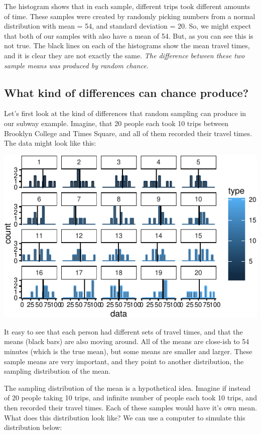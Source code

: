 The histogram shows that in each sample, different trips took different
amounts of time. These samples were created by randomly picking numbers
from a normal distribution with mean = 54, and standard deviation = 20.
So, we might expect that both of our samples with also have a mean of
54. But, as you can see this is not true. The black lines on each of the
histograms show the mean travel times, and it is clear they are not
exactly the same.
\emph{The difference between these two sample means was produced by random chance.}

\subsection{What kind of differences can chance
produce?}\label{what-kind-of-differences-can-chance-produce}

Let's first look at the kind of differences that random sampling can
produce in our subway example. Imagine, that 20 people each took 10
trips between Brooklyn College and Times Square, and all of them
recorded their travel times. The data might look like this:

\includegraphics{Ttest_files/figure-latex/unnamed-chunk-3-1}

It easy to see that each person had different sets of travel times, and
that the means (black bars) are also moving around. All of the means are
close-ish to 54 minutes (which is the true mean), but some means are
smaller and larger. These sample means are very important, and they
point to another distribution, the sampling distribution of the mean.

The sampling distribution of the mean is a hypothetical idea. Imagine if
instead of 20 people taking 10 trips, and infinite number of people each
took 10 trips, and then recorded their travel times. Each of these
samples would have it's own mean. What does this distribution look like?
We can use a computer to simulate this distribution below:

